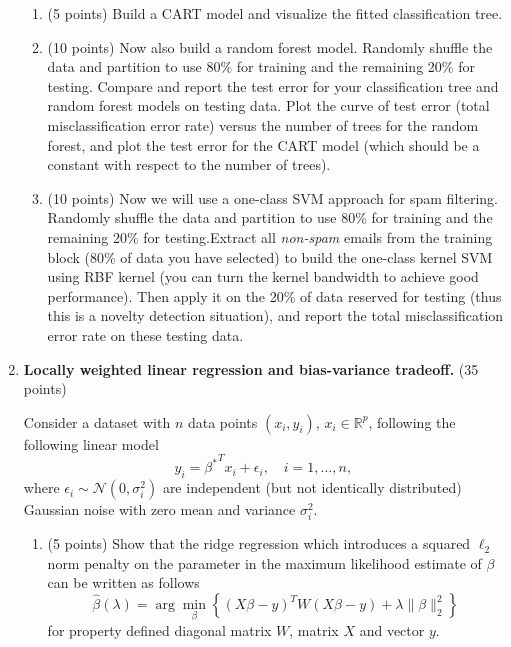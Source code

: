 \documentclass[twoside,10pt]{article}
\begin{document}
\begin{enumerate}
\begin{enumerate}

\item (5 points) Build a CART model and visualize the fitted classification tree.

\item (10 points) Now also build a random forest model. Randomly shuffle the data and partition to use  80\% for training and the remaining 20\% for testing. Compare and report the test error for your classification tree and random forest models on testing data. Plot the curve of test error (total misclassification error rate) versus the number of trees for the random forest, and plot the test error for the CART model (which should be a constant with respect to the number of trees). 

\item (10 points) Now we will use a one-class SVM approach for spam filtering. Randomly shuffle the data and partition to use  80\% for training and the remaining 20\% for testing.Extract all {\it non-spam} emails from the training block (80\% of data you have selected) to build the one-class kernel SVM using RBF kernel (you can turn the kernel bandwidth to achieve good performance). Then apply it on the 20\% of data reserved for testing (thus this is a novelty detection situation), and report the total misclassification error rate on these testing data. 

\end{enumerate}



\clearpage 

\item {\bf Locally weighted linear regression and bias-variance tradeoff.} (35 points)

Consider a dataset with $n$ data points $(x_i, y_i)$, $x_i \in \mathbb R^p$, following the following linear model
\[
y_i = {\beta^*}^T x_i + \epsilon_i, \quad i = 1, \ldots, n,
\]
where $\epsilon_i \sim \mathcal N(0, \sigma_i^2)$ are independent (but not identically distributed) Gaussian noise with zero mean and variance $\sigma_i^2$.

 
\begin{enumerate}

\item (5 points) Show that the ridge regression which introduces a squared $\ell_2$ norm penalty on the parameter in the maximum likelihood estimate of $\beta$ can be written as follows
\[
\hat \beta (\lambda) = \arg \min_{\beta} 
\left\{
(X \beta - y)^T W (X \beta - y) + \lambda \|\beta\|_2^2
\right\}
\]
for property defined diagonal matrix $W$, matrix $X$ and vector $y$. 



\end{enumerate}
\end{enumerate}
\end{document}
